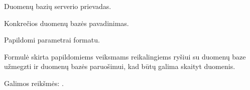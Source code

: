 \documentclass[letterpaper,10pt,lithuanian]{sphinxmanual}
\begin{document}
\begin{fulllineitems}
\begin{fulllineitems}
\pysigstartsignatures
{}
\pysigstopsignatures
\sphinxAtStartPar
Duomenų bazių serverio prievadas.

\end{fulllineitems}



\begin{fulllineitems}

\pysigstartsignatures
{}
\pysigstopsignatures
\sphinxAtStartPar
Konkrečios duomenų bazės pavadinimas.

\end{fulllineitems}



\begin{fulllineitems}

\pysigstartsignatures
{}
\pysigstopsignatures
\sphinxAtStartPar
Papildomi parametrai  formatu.

\end{fulllineitems}


\end{fulllineitems}



\begin{fulllineitems}

\pysigstartsignatures
{}
\pysigstopsignatures
\sphinxAtStartPar
Formulė skirta papildomiems veiksmams reikalingiems ryšiui su duomenų baze
užmegzti ir duomenų bazės paruošimui, kad būtų galima skaityt duomenis.

\end{fulllineitems}



\begin{fulllineitems}

\pysigstartsignatures
{}
\pysigstopsignatures
\sphinxAtStartPar
Galimos reikšmės: .

\end{fulllineitems}
\end{document}
